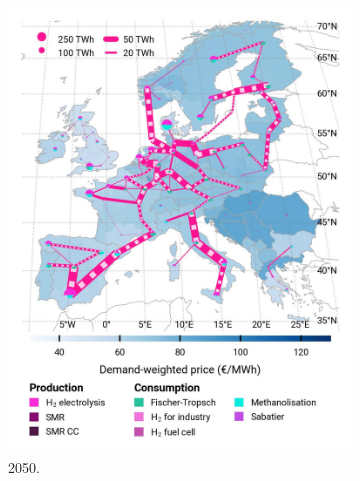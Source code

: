 \documentclass[preprint,12pt,sort&compress]{elsarticle}
\begin{document}
\begin{figure}[htbp]
\begin{subfigure}[t]{0.33\textwidth}
    \includegraphics[width=1\textwidth]{maps/pcipmi-national-expansion/base_s_adm___2050-balance_map_H2}
    \caption{ 2050.}
    \label{fig:PCI-n_lt_2050_h2}
  \end{subfigure}
  \begin{subfigure}[t]{0.33\textwidth}
      \vspace{0pt}

\end{subfigure}
\end{figure}
\end{document}
